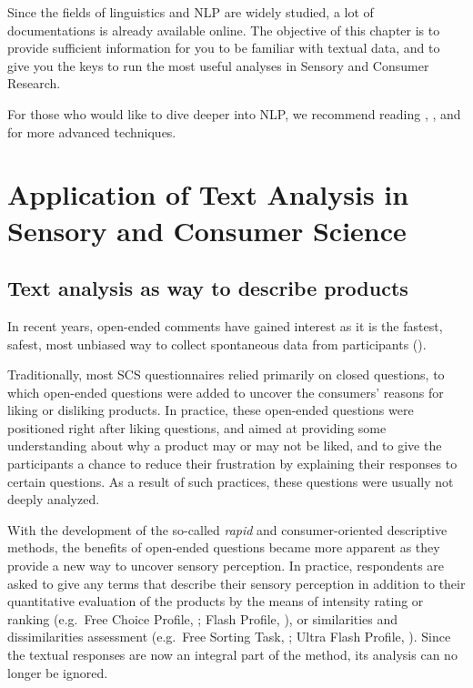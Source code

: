 \documentclass[
]{krantz}
\begin{document}
Since the fields of linguistics and NLP are widely studied, a lot of documentations is already available online. The objective of this chapter is to provide sufficient information for you to be familiar with textual data, and to give you the keys to run the most useful analyses in Sensory and Consumer Research.

For those who would like to dive deeper into NLP, we recommend reading \citet{Silge2017}, \citet{Becue-Bertaut2019}, and \citet{Hvitfeldt2021} for more advanced techniques.

\hypertarget{application-of-text-analysis-in-sensory-and-consumer-science}{%
\section{Application of Text Analysis in Sensory and Consumer Science}\label{application-of-text-analysis-in-sensory-and-consumer-science}}

\hypertarget{text-analysis-as-way-to-describe-products}{%
\subsection{Text analysis as way to describe products}\label{text-analysis-as-way-to-describe-products}}

In recent years, open-ended comments have gained interest as it is the fastest, safest, most unbiased way to collect spontaneous data from participants (\citet{Piqueras2015}).

Traditionally, most SCS questionnaires relied primarily on closed questions, to which open-ended questions were added to uncover the consumers' reasons for liking or disliking products. In practice, these open-ended questions were positioned right after liking questions, and aimed at providing some understanding about why a product may or may not be liked, and to give the participants a chance to reduce their frustration by explaining their responses to certain questions. As a result of such practices, these questions were usually not deeply analyzed.

With the development of the so-called \emph{rapid} and consumer-oriented descriptive methods, the benefits of open-ended questions became more apparent as they provide a new way to uncover sensory perception. In practice, respondents are asked to give any terms that describe their sensory perception in addition to their quantitative evaluation of the products by the means of intensity rating or ranking (e.g.~Free Choice Profile, \citet{Williams1984}; Flash Profile, \citet{Delarue2004}), or similarities and dissimilarities assessment (e.g.~Free Sorting Task, \citet{Cadoret2009}; Ultra Flash Profile, \citet{Perrin2008}). Since the textual responses are now an integral part of the method, its analysis can no longer be ignored.
\end{document}
